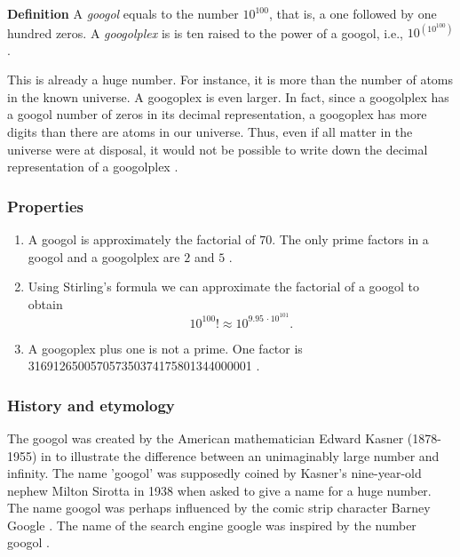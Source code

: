 \documentclass[12pt]{article}
\begin{document}
{\bf Definition}
A \emph{googol} equals to the number $10^{100}$, that is, a one followed by
one hundred zeros.
A \emph{googolplex} is
is  ten raised to the power of a googol, i.e., $10^{(10^{100})}$.

This is already a huge number. For instance,
it is more than the number of atoms in the known universe.
A googoplex is even larger. In fact, since a googolplex has 
a googol number of zeros in its decimal
representation, 
a googoplex has more digits than there are atoms in our universe. 
Thus, even if all matter in the universe were at disposal,
it would not be possible to write down the decimal representatio{n} of
a googolplex \cite{wikigoogol}.

\subsubsection*{Properties}
\begin{enumerate}
\item
A googol is approximately the factorial of $70$.
The only prime factors in a googol and a googolplex are $2$ and $5$ \cite{wikigoogol}.
\item Using Stirling's formula  we can approximate the factorial of  a googol to obtain
$$ 
  10^{100}! \approx 10^{9.95\, \cdot 10^{101}}.$$
\item A googoplex plus one is not a prime. One factor is 316912650057057350374175801344000001 \cite{mrob}.
\end{enumerate}

\subsubsection*{History and etymology}
The googol was created by the American mathematician Edward Kasner (1878-1955) \cite{wikikasner}
in \cite{kasner} to  illustrate the difference between an
 unimaginably large number and infinity.
The name 'googol' was supposedly coined by Kasner's
nine-year-old nephew Milton Sirotta in 1938 when asked to give a name for a huge number.
The name googol was perhaps influenced by
the comic strip character Barney Google \cite{wikigoogol, harper}.
The name of the search engine google was inspired by the number 
googol \cite{google}.
\end{document}

